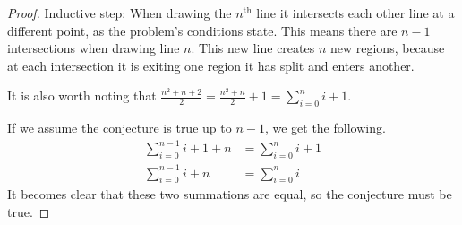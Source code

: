 \documentclass[12pt,a4paper,reqno,parskip=full]{amsart}
\numberwithin{equation}{section}
\theoremstyle{plain}
\theoremstyle{definition}
\begin{document}
\begin{enumerate}
\begin{proof}
          Inductive step: When drawing the $n^{\text{th}}$ line it intersects each other line at a different point, as the problem's conditions state. This means there are $n - 1$ intersections when drawing line $n$. This new line creates $n$ new regions, because at each intersection it is exiting one region it has split and enters another.

          It is also worth noting that 
          $\displaystyle\frac{n^2+n+2}{2} = \frac{n^2+n}{2} + 1 = \sum_{i=0}^ni + 1$.

          If we assume the conjecture is true up to $n-1$, we get the following.
          \begin{align*}
            \sum_{i=0}^{n-1}i + 1 + n & = \sum_{i=0}^ni + 1 \\
            \sum_{i=0}^{n-1}i + n     & = \sum_{i=0}^ni
          \end{align*}
          It becomes clear that these two summations are equal, so the conjecture must be true.
        \end{proof}
\end{enumerate}
\end{document}

